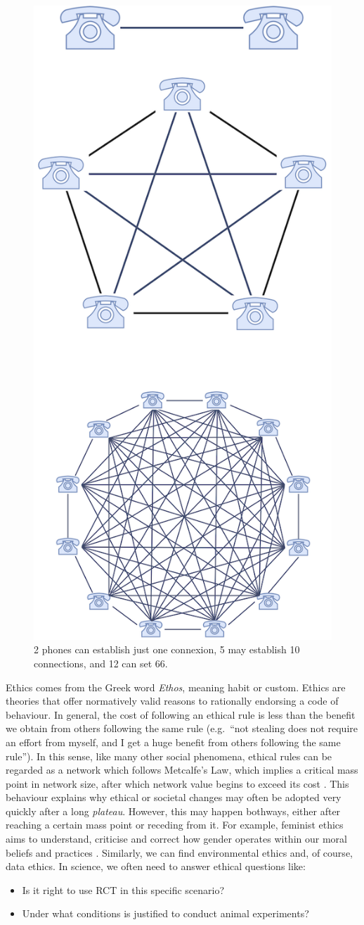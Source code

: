 \documentclass[
]{book}
\providecommand{\tightlist}{%
  \setlength{\itemsep}{0pt}\setlength{\parskip}{0pt}}
\begin{document}
\begin{figure}  
 \begin{center}
    \includegraphics[width=.22\textwidth]{Figures/metcalfe.png}  
  \captionsetup{labelformat=empty}
  \caption{2 phones can establish just one connexion, 5 may establish 10 connections, and 12 can set 66.} 
\end{center}
\end{figure}
\addtocounter{figure}{-1}

Ethics comes from the Greek word \emph{Ethos}, meaning habit or custom. Ethics are theories that offer normatively valid reasons to rationally endorsing a code of behaviour. In general, the cost of following an ethical rule is less than the benefit we obtain from others following the same rule (e.g.~``not stealing does not require an effort from myself, and I get a huge benefit from others following the same rule''). In this sense, like many other social phenomena, ethical rules can be regarded as a network which follows Metcalfe's Law, which implies a critical mass point in network size, after which network value begins to exceed its cost \citep{metcalfe2013metcalfe}. This behaviour explains why ethical or societal changes may often be adopted very quickly after a long \emph{plateau}. However, this may happen bothways, either after reaching a certain mass point or receding from it. For example, feminist ethics aims to understand, criticise and correct how gender operates within our moral beliefs and practices \citep{sep-feminism-ethics}. Similarly, we can find environmental ethics and, of course, data ethics. In science, we often need to answer ethical questions like:

\begin{itemize}
\tightlist
\item
  Is it right to use RCT in this specific scenario?
\item
  Under what conditions is justified to conduct animal experiments?
\end{itemize}
\end{document}
